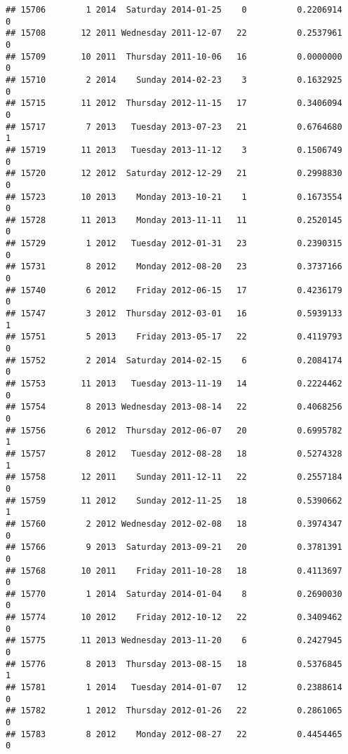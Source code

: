 \documentclass[
]{article}
\begin{document}
\begin{verbatim}
## 15706        1 2014  Saturday 2014-01-25    0          0.2206914             0
## 15708       12 2011 Wednesday 2011-12-07   22          0.2537961             0
## 15709       10 2011  Thursday 2011-10-06   16          0.0000000             0
## 15710        2 2014    Sunday 2014-02-23    3          0.1632925             0
## 15715       11 2012  Thursday 2012-11-15   17          0.3406094             0
## 15717        7 2013   Tuesday 2013-07-23   21          0.6764680             1
## 15719       11 2013   Tuesday 2013-11-12    3          0.1506749             0
## 15720       12 2012  Saturday 2012-12-29   21          0.2998830             0
## 15723       10 2013    Monday 2013-10-21    1          0.1673554             0
## 15728       11 2013    Monday 2013-11-11   11          0.2520145             0
## 15729        1 2012   Tuesday 2012-01-31   23          0.2390315             0
## 15731        8 2012    Monday 2012-08-20   23          0.3737166             0
## 15740        6 2012    Friday 2012-06-15   17          0.4236179             0
## 15747        3 2012  Thursday 2012-03-01   16          0.5939133             1
## 15751        5 2013    Friday 2013-05-17   22          0.4119793             0
## 15752        2 2014  Saturday 2014-02-15    6          0.2084174             0
## 15753       11 2013   Tuesday 2013-11-19   14          0.2224462             0
## 15754        8 2013 Wednesday 2013-08-14   22          0.4068256             0
## 15756        6 2012  Thursday 2012-06-07   20          0.6995782             1
## 15757        8 2012   Tuesday 2012-08-28   18          0.5274328             1
## 15758       12 2011    Sunday 2011-12-11   22          0.2557184             0
## 15759       11 2012    Sunday 2012-11-25   18          0.5390662             1
## 15760        2 2012 Wednesday 2012-02-08   18          0.3974347             0
## 15766        9 2013  Saturday 2013-09-21   20          0.3781391             0
## 15768       10 2011    Friday 2011-10-28   18          0.4113697             0
## 15770        1 2014  Saturday 2014-01-04    8          0.2690030             0
## 15774       10 2012    Friday 2012-10-12   22          0.3409462             0
## 15775       11 2013 Wednesday 2013-11-20    6          0.2427945             0
## 15776        8 2013  Thursday 2013-08-15   18          0.5376845             1
## 15781        1 2014   Tuesday 2014-01-07   12          0.2388614             0
## 15782        1 2012  Thursday 2012-01-26   22          0.2861065             0
## 15783        8 2012    Monday 2012-08-27   22          0.4454465             0

\end{verbatim}
\end{document}
